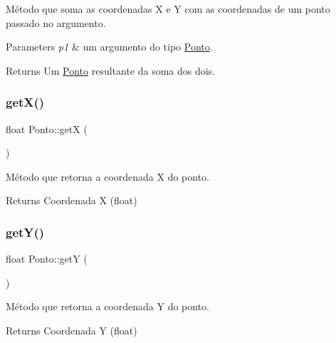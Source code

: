 Método que soma as coordenadas X e Y com as coordenadas de um ponto passado no argumento. 


\begin{DoxyParams}{Parameters}
{\em p1} & um argumento do tipo \mbox{\hyperlink{classPonto}{Ponto}}. \\
\hline
\end{DoxyParams}
\begin{DoxyReturn}{Returns}
Um \mbox{\hyperlink{classPonto}{Ponto}} resultante da soma dos dois. 
\end{DoxyReturn}
\mbox{\label{classPonto_ae4823d6ee26ff3448ee403d26a3c6d2f}} 
\subsubsection{\texorpdfstring{get\+X()}{getX()}}
{\footnotesize\ttfamily float Ponto\+::getX (\begin{DoxyParamCaption}{ }\end{DoxyParamCaption})\hspace{0.3cm}{\ttfamily [inline]}}



Método que retorna a coordenada X do ponto. 

\begin{DoxyReturn}{Returns}
Coordenada X (float) 
\end{DoxyReturn}
\mbox{\label{classPonto_ab120600953e6544301223b9b05a43ee5}} 
\subsubsection{\texorpdfstring{get\+Y()}{getY()}}
{\footnotesize\ttfamily float Ponto\+::getY (\begin{DoxyParamCaption}{ }\end{DoxyParamCaption})\hspace{0.3cm}{\ttfamily [inline]}}



Método que retorna a coordenada Y do ponto. 

\begin{DoxyReturn}{Returns}
Coordenada Y (float) 
\end{DoxyReturn}
\mbox{\label{classPonto_a9b0ddbdddd05edbc4d45ef0671a628c6}} 
